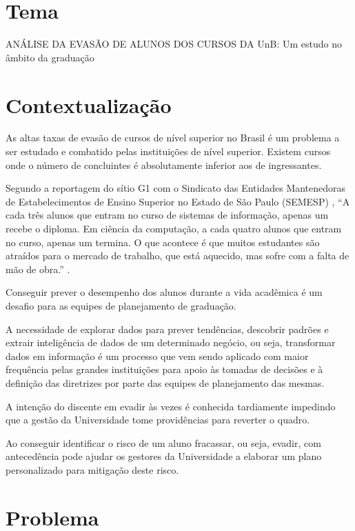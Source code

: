 \section{Tema}%
ANÁLISE DA EVASÃO DE ALUNOS DOS CURSOS DA UnB: Um estudo no âmbito da graduação

\section{Contextualização}%

As altas taxas de evasão de cursos de nível superior no Brasil é um problema a ser estudado e combatido pelas instituições de nível superior. Existem cursos onde o  número de concluintes é absolutamente inferior aos de ingressantes.

Segundo a reportagem do sítio G1 com o Sindicato das Entidades Mantenedoras de Estabelecimentos de Ensino Superior no Estado de São Paulo (SEMESP) \cite{SindicatodasEntidadesMantenedorasdeEstabelecimentosdeEnsinoSuperiornoEstadodeSaoPauloSEMESP2012IndiceInformacao}, “A cada três alunos que entram no curso de sistemas de informação, apenas um recebe o diploma.  Em ciência da computação, a cada quatro alunos que entram no curso, apenas um termina. O que acontece é que muitos estudantes são atraídos para o mercado de trabalho, que está aquecido, mas sofre com a falta de mão de obra.” . 

Conseguir prever o desempenho dos alunos durante a vida acadêmica é um desafio para as equipes de planejamento de graduação. 

A necessidade de explorar dados para prever tendências, descobrir padrões e extrair inteligência de dados de um determinado negócio, ou seja, transformar dados em informação é um processo que vem sendo aplicado com  maior frequência pelas grandes instituições para apoio às tomadas de decisões e à definição das diretrizes por parte das equipes de planejamento das mesmas.

A intenção do discente em evadir às vezes é conhecida tardiamente impedindo que a gestão da Universidade tome providências para reverter o quadro.

Ao conseguir identificar o risco de um aluno fracassar, ou seja, evadir, com antecedência pode ajudar os gestores da Universidade a elaborar um plano personalizado para mitigação deste risco.

\section{Problema}%


